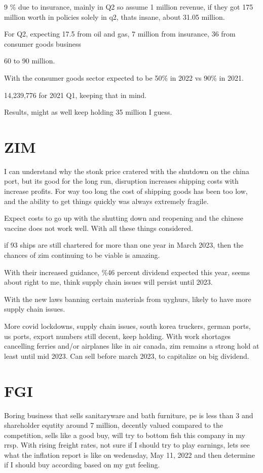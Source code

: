 9 \% due to insurance, mainly in Q2 so assume 1 million revenue, if they got 175 million worth in policies solely in q2, thats insane, about 31.05 million.

For Q2, expecting 17.5 from oil and gas, 7 million from insurance, 36 from consumer goods business

60 to 90 million.

With the consumer goods sector expected to be 50\% in 2022 vs 90\% in 2021.

14,239,776 for 2021 Q1, keeping that in mind.

Results, might as well keep holding 35 million I guess.

\section{ZIM}

I can understand why the stonk price cratered with the shutdown on the china port, but its good for the long run, disruption increases shipping costs with increase profits. For way too long the cost of shipping goods has been too low, and the ability to get things quickly was always extremely fragile.

Expect costs to go up with the shutting down and reopening and the chinese vaccine does not work well.
With all these things considered.

if 93 ships are still chartered for more than one year in March 2023, then the chances of zim continuing to be viable is amazing.

With their increased guidance, \%46 percent dividend expected this year, seems about right to me, think supply chain issues will persist until 2023.

With the new laws banning certain materials from uyghurs, likely to have more supply chain issues.

More covid lockdowns, supply chain issues, south korea truckers, german ports, us ports, export numbers still decent, keep holding. With work shortages cancelling ferries and/or airplanes like in air canada, zim remains a strong hold at least until mid 2023. Can sell before march 2023, to capitalize on big dividend.


\section{FGI}

Boring business that sells sanitaryware and bath furniture, pe is less than 3 and shareholder equtity around 7 million, decently valued compared to the competition, sells like a good buy, will try to bottom fish this company in my rrsp. With rising freight rates, not sure if I should try to play earnings, lets see what the inflation report is like on wedensday, May 11, 2022 and then determine if I should buy according based on my gut feeling.

